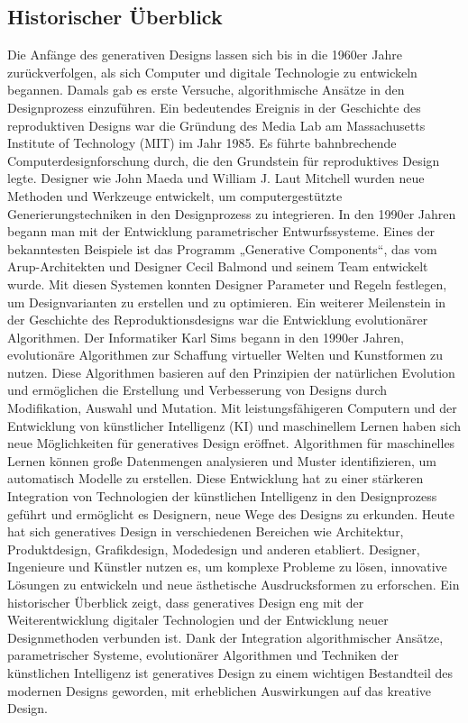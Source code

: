 \subsection*{Historischer Überblick}
Die Anfänge des generativen Designs lassen sich bis in die 1960er Jahre zurückverfolgen, als sich Computer und  digitale Technologie zu entwickeln begannen. Damals gab es erste Versuche, algorithmische Ansätze in den Designprozess einzuführen.  
 Ein bedeutendes Ereignis in der Geschichte des reproduktiven Designs war die Gründung des Media Lab am Massachusetts Institute of Technology (MIT)  im Jahr 1985. Es führte bahnbrechende Computerdesignforschung durch, die den Grundstein für reproduktives Design legte. Designer wie John Maeda und William J. Laut Mitchell wurden neue Methoden und Werkzeuge entwickelt, um computergestützte Generierungstechniken in den Designprozess zu integrieren. 
  In den 1990er Jahren begann man mit der Entwicklung parametrischer Entwurfssysteme. Eines der bekanntesten Beispiele ist das Programm „Generative Components“, das vom Arup-Architekten und Designer Cecil Balmond und seinem Team  entwickelt wurde. Mit diesen Systemen konnten Designer Parameter und Regeln festlegen, um Designvarianten zu erstellen und zu optimieren.  
 Ein weiterer Meilenstein in der Geschichte des Reproduktionsdesigns war die Entwicklung evolutionärer Algorithmen. Der Informatiker Karl Sims begann in den 1990er Jahren, evolutionäre Algorithmen zur Schaffung virtueller Welten und Kunstformen zu nutzen. Diese Algorithmen basieren auf den Prinzipien der natürlichen Evolution und ermöglichen die Erstellung und Verbesserung von Designs durch Modifikation, Auswahl und Mutation. 
 Mit leistungsfähigeren Computern und der Entwicklung von künstlicher Intelligenz (KI) und maschinellem Lernen haben sich neue Möglichkeiten für generatives Design eröffnet. Algorithmen für maschinelles Lernen können große Datenmengen analysieren und Muster identifizieren, um  automatisch Modelle zu erstellen. Diese Entwicklung hat zu einer stärkeren Integration von Technologien der künstlichen Intelligenz in den Designprozess geführt und ermöglicht es Designern, neue Wege des Designs zu erkunden. Heute hat sich generatives Design in verschiedenen Bereichen wie Architektur, Produktdesign, Grafikdesign, Modedesign und anderen etabliert. Designer, Ingenieure und Künstler nutzen es, um komplexe Probleme zu lösen, innovative Lösungen zu entwickeln und neue ästhetische Ausdrucksformen zu erforschen. 
 Ein historischer Überblick zeigt, dass generatives Design eng mit  der Weiterentwicklung digitaler Technologien und der Entwicklung neuer Designmethoden verbunden ist. Dank der Integration algorithmischer Ansätze, parametrischer Systeme, evolutionärer Algorithmen und Techniken der künstlichen Intelligenz ist generatives Design zu einem wichtigen Bestandteil des modernen Designs geworden, mit erheblichen Auswirkungen auf das kreative Design.
